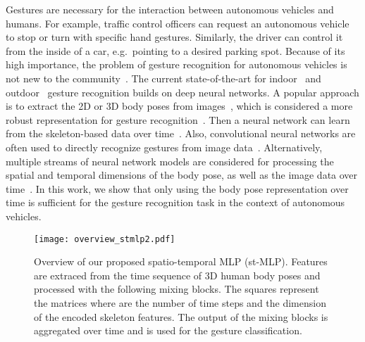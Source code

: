 \documentclass[letterpaper, 10 pt, conference]{ieeeconf}
\begin{document}
Gestures are necessary for the interaction between autonomous vehicles and humans. For example, traffic control officers can request an autonomous vehicle to stop or turn with specific hand gestures. Similarly, the driver can control it from the inside of a car, e.g.~pointing to a desired parking spot. Because of its high importance, the problem of gesture recognition for autonomous vehicles is not new to the community~\cite{Chaman2018, bergasa2006real, liang2007real}. The current state-of-the-art for indoor~\cite{drive_and_act_2019_iccv} and outdoor~\cite{wiederer2020traffic} gesture recognition builds on deep neural networks. A popular approach is to extract the 2D or 3D body poses from images~\cite{bouazizi2021learning, bouazizi2021self, belagiannis2014holistic}, which is considered a more robust representation for gesture recognition~\cite{zimek2012survey, jhuang2013towards}. Then a neural network can learn from the skeleton-based data over time~\cite{wiederer2020traffic,yan2018spatial}. Also, convolutional neural networks are often used to directly recognize gestures from image data~\cite{carreira2017quo,qiu2017learning}. Alternatively, multiple streams of neural network models are considered for processing the spatial and temporal dimensions of the body pose, as well as the image data over time~\cite{martin2018body}. In this work, we show that only using the body pose representation over time is sufficient for the gesture recognition task in the context of autonomous vehicles.

\begin{figure}[!ht]
\vspace{2mm}
    \centering
    \texttt{[image: overview\_stmlp2.pdf]}
    \caption{Overview of our proposed spatio-temporal MLP (st-MLP). Features are extraced from the time sequence of 3D human body poses and processed with the following  mixing blocks. The squares represent the matrices where  are the number of time steps and  the dimension of the encoded skeleton features. The output of the mixing blocks is aggregated over time and is used for the gesture classification.}
    \label{fig:overview_stmlp}
\end{figure}
\end{document}
